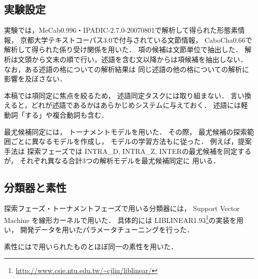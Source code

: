\documentclass[japanese]{jnlp_1.4}
\begin{document}
\subsection{実験設定}
                実験では，MeCab0.996・IPADIC-2.7.0-20070801で解析して得られた形態素情報，
                京都大学テキストコーパス3.0で付与されている文節情報，
                CaboCha0.66で解析して得られた係り受け関係を用いた．
項の候補は文節単位で抽出した．
解析は文頭から文末の順で行い，述語を含む文以降からは項候補を抽出しない．
なお，ある述語の格についての解析結果は
同じ述語の他の格についての解析に影響を及ぼさない．


本稿では項同定に焦点を絞るため，
述語同定タスクには取り組まない．
言い換えると，どれが述語であるかはあらかじめシステムに与えておく．
述語には軽動詞「する」や複合動詞も含む．



最尤候補同定には，
トーナメントモデル\cite{Iida:2004:IPSJ}を用いた．
その際，
最尤候補の探索範囲ごとに異なるモデルを作成し，
モデルの学習方法も\cite{Iida:2004:IPSJ}に従った．
例えば，提案手法は
探索フェーズでは
INTRA\_D, INTRA\_Z, INTERの最尤候補を同定するが，
それぞれ異なる合計3つの解析モデルを最尤候補同定に
用いる．


\subsection{分類器と素性}
\label{sec:feature}

探索フェーズ・トーナメントフェーズで用いる分類器には，
Support Vector Machine \cite{Cortes:1995:ML}を線形カーネルで用いた．
具体的には
LIBLINEAR1.93\footnote{\url{http://www.csie.ntu.edu.tw/~cjlin/liblinear/}}の実装を用い，
開発データを用いたパラメータチューニングを行った．

素性にはで用いられたものとほぼ同一の素性を用いた．
\end{document}
